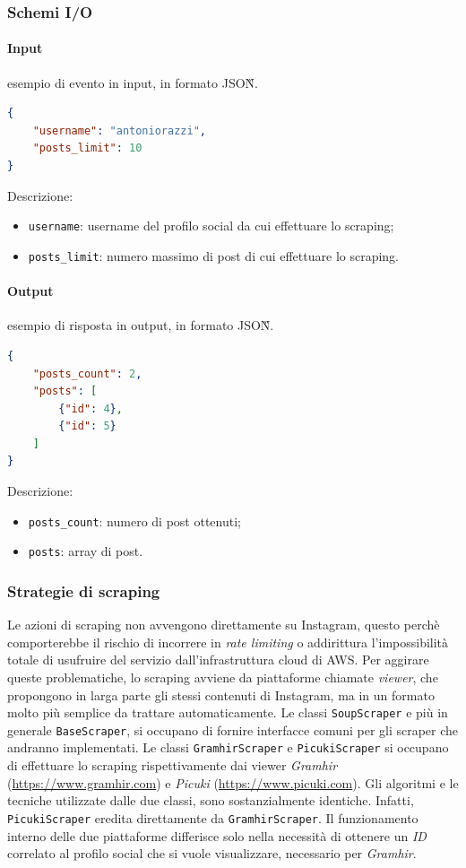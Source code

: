 \subsubsection{Schemi I/O}
\paragraph*{Input} esempio di evento in input, in formato JSON\G{}.
\begin{lstlisting}[language=JSON]
{
    "username": "antoniorazzi",
    "posts_limit": 10
}
\end{lstlisting}
Descrizione:
\begin{itemize}
    \item \verb|username|: username del profilo social da cui effettuare lo scraping;
    \item \verb|posts_limit|: numero massimo di post di cui effettuare lo scraping. 
\end{itemize}

\paragraph*{Output} esempio di risposta in output, in formato JSON\G{}.
\begin{lstlisting}[language=JSON]
{
    "posts_count": 2,
    "posts": [
        {"id": 4},
        {"id": 5}
    ]
}
\end{lstlisting}
Descrizione:
\begin{itemize}
    \item \verb|posts_count|: numero di post ottenuti;
    \item \verb|posts|: array di post. 
\end{itemize}

\subsubsection{Strategie di scraping}
Le azioni di scraping non avvengono direttamente su Instagram, questo perchè comporterebbe il
rischio di incorrere in \textit{rate limiting} o addirittura l'impossibilità totale di usufruire del servizio dall'infrastruttura cloud di AWS.
Per aggirare queste problematiche, lo scraping avviene da piattaforme chiamate \textit{viewer},
che propongono in larga parte gli stessi contenuti di Instagram, ma in un formato molto più semplice da trattare automaticamente.\aCapo
Le classi \verb|SoupScraper| e più in generale \verb|BaseScraper|, si occupano di fornire interfacce comuni per gli scraper che andranno implementati.
Le classi \verb|GramhirScraper| e \verb|PicukiScraper| si occupano di effettuare lo scraping 
rispettivamente dai viewer \textit{Gramhir} (\url{https://www.gramhir.com}) e \textit{Picuki} (\url{https://www.picuki.com}). Gli algoritmi e le tecniche utilizzate dalle due classi, sono sostanzialmente identiche.
Infatti, \verb|PicukiScraper| eredita direttamente da \verb|GramhirScraper|.
Il funzionamento interno delle due piattaforme differisce solo nella necessità di ottenere un 
\textit{ID} correlato al profilo social che si vuole visualizzare, necessario per \textit{Gramhir}.

